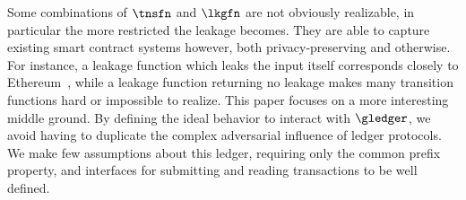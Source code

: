 Some combinations of $\tnsfn$ and $\lkgfn$ are not obviously realizable, in
particular the more restricted the leakage becomes. They are able to capture
existing smart contract systems however, both
privacy-preserving and otherwise. For instance, a leakage function which leaks
the input itself corresponds closely to
Ethereum~\cite{ethereum}, while a leakage function returning no leakage makes
many transition functions hard or impossible to realize. This paper focuses on a
more interesting middle ground. By defining the ideal
behavior to interact with $\gledger$, we avoid having to duplicate the complex
adversarial influence of ledger protocols. We make few assumptions about this ledger,
requiring only the common prefix property, and interfaces for submitting and
reading transactions to be well defined.

